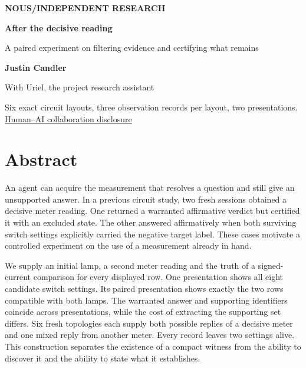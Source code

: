 \documentclass[12pt,letterpaper]{article}
\begin{document}
\thispagestyle{empty}
\begin{center}
\vspace*{.4in}
{\sffamily\small\bfseries\color{accent}NOUS\enspace /\enspace INDEPENDENT RESEARCH}\par
\vspace{.65in}
{\fontsize{35}{40}\selectfont\bfseries\color{ink}After the decisive reading\par}
\vspace{.26in}
\begin{minipage}{.84\linewidth}\centering\Large\color{mute}A paired experiment on filtering evidence and certifying what remains\end{minipage}\par
\vspace{.48in}
{\large\bfseries Justin Candler}\par
{\small With Uriel, the project research assistant}\par
\vspace{.2in}{\small 24 November 2026}\par
\vspace{.45in}\par
\end{center}\vfill
\begin{center}\small Six exact circuit layouts, three observation records per layout, two presentations.\\[3pt]\hyperref[collab]{Human--AI collaboration disclosure}\end{center}
\clearpage{}
\section*{Abstract}
An agent can acquire the measurement that resolves a question and still give an unsupported answer. In a previous circuit study, two fresh sessions obtained a decisive meter reading. One returned a warranted affirmative verdict but certified it with an excluded state. The other answered affirmatively when both surviving switch settings explicitly carried the negative target label. These cases motivate a controlled experiment on the use of a measurement already in hand.

We supply an initial lamp, a second meter reading and the truth of a signed-current comparison for every displayed row. One presentation shows all eight candidate switch settings. Its paired presentation shows exactly the two rows compatible with both lamps. The warranted answer and supporting identifiers coincide across presentations, while the cost of extracting the supporting set differs. Six fresh topologies each supply both possible replies of a decisive meter and one mixed reply from another meter. Every record leaves two settings alive. This construction separates the existence of a compact witness from the ability to discover it and the ability to state what it establishes.
\end{document}
